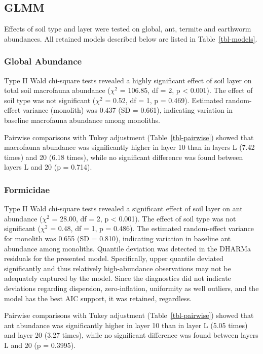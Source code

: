 \documentclass[
  american,
  11pt,
]{stylisharticle}
\begin{document}
\subsection{GLMM}\label{glmm}

Effects of soil type and layer were tested on global, ant, termite and
earthworm abundances. All retained models described below are listed in
Table~\ref{tbl-models}.

\subsubsection{Global Abundance}\label{global-abundance}

Type II Wald chi-square tests revealed a highly significant effect of
soil layer on total soil macrofauna abundance (\(\chi^2\) = 106.85, df =
2, p \textless{} 0.001). The effect of soil type was not significant
(\(\chi^2\) = 0.52, df = 1, p = 0.469). Estimated random-effect variance
(monolith) was 0.437 (SD = 0.661), indicating variation in baseline
macrofauna abundance among monoliths.

Pairwise comparisons with Tukey adjustment (Table~\ref{tbl-pairwise})
showed that macrofauna abundance was significantly higher in layer 10
than in layers L (7.42 times) and 20 (6.18 times), while no significant
difference was found between layers L and 20 (p = 0.714).

\subsubsection{Formicidae}\label{formicidae}

Type II Wald chi-square tests revealed a significant effect of soil
layer on ant abundance (\(\chi^2\) = 28.00, df = 2, p \textless{}
0.001). The effect of soil type was not significant (\(\chi^2\) = 0.48,
df = 1, p = 0.486). The estimated random-effect variance for monolith
was 0.655 (SD = 0.810), indicating variation in baseline ant abundance
among monoliths. Quantile deviation was detected in the DHARMa residuals
for the presented model. Specifically, upper quantile deviated
significantly and thus relatively high-abundance observations may not be
adequately captured by the model. Since the diagnostics did not indicate
deviations regarding dispersion, zero-inflation, uniformity as well
outliers, and the model has the best AIC support, it was retained,
regardless.

Pairwise comparisons with Tukey adjustment (Table~\ref{tbl-pairwise})
showed that ant abundance was significantly higher in layer 10 than in
layer L (5.05 times) and layer 20 (3.27 times), while no significant
difference was found between layers L and 20 (p = 0.3995).
\end{document}
